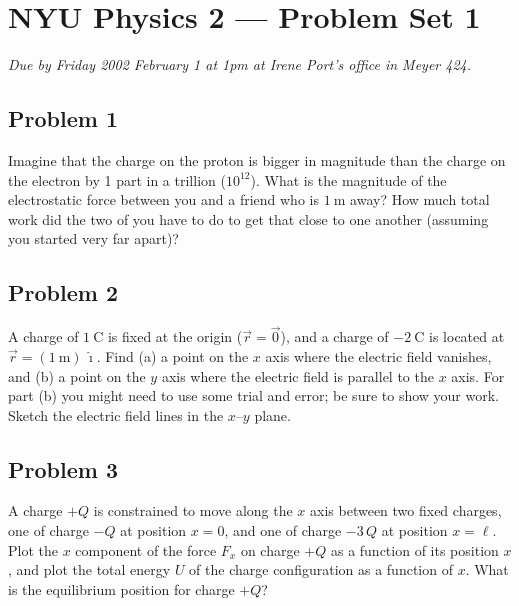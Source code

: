 \documentclass{article}
\begin{document}
\thispagestyle{empty}
\section*{NYU Physics 2 --- Problem Set 1}

\emph{Due by Friday 2002 February 1 at 1pm at Irene Port's office in
Meyer 424.}

\subsection*{Problem 1}

Imagine that the charge on the proton is bigger in magnitude than the
charge on the electron by 1 part in a trillion ($10^{12}$).  What is
the magnitude of the electrostatic force between you and a friend who
is $1~\mathrm{m}$ away?  How much total work did the two of you have
to do to get that close to one another (assuming you started very far
apart)?

\subsection*{Problem 2}

A charge of $1~\mathrm{C}$ is fixed at the origin ($\vec{r}=\vec{0}$),
and a charge of $-2~\mathrm{C}$ is located at
$\vec{r}=(1~\mathrm{m})\,\hat\imath$.  Find (a) a point on the $x$
axis where the electric field vanishes, and (b) a point on the $y$
axis where the electric field is parallel to the $x$ axis.  For part
(b) you might need to use some trial and error; be sure to show your
work.  Sketch the electric field lines in the $x$--$y$ plane.

\subsection*{Problem 3}

A charge $+Q$ is constrained to move along the $x$ axis between two
fixed charges, one of charge $-Q$ at position $x=0$, and one of charge
$-3\,Q$ at position $x=\ell$.  Plot the $x$ component of the force
$F_x$ on charge $+Q$ as a function of its position $x$, and plot the
total energy $U$ of the charge configuration as a function of $x$.
What is the equilibrium position for charge $+Q$?
\end{document}

